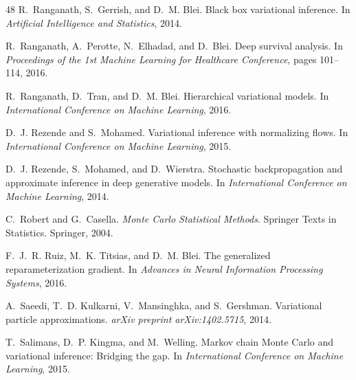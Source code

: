 \begin{thebibliography}{48}
R.~Ranganath, S.~Gerrish, and D.~M. Blei.
\newblock Black box variational inference.
\newblock In \emph{Artificial Intelligence and Statistics}, 2014.

R.~Ranganath, A.~Perotte, N.~Elhadad, and D.~Blei.
\newblock Deep survival analysis.
\newblock In \emph{Proceedings of the 1st Machine Learning for Healthcare
  Conference}, pages 101--114, 2016{}.

R.~Ranganath, D.~Tran, and D.~M. Blei.
\newblock Hierarchical variational models.
\newblock In \emph{International Conference on Machine Learning},
  2016{}.

D.~J. Rezende and S.~Mohamed.
\newblock Variational inference with normalizing flows.
\newblock In \emph{International Conference on Machine Learning}, 2015.

D.~J. Rezende, S.~Mohamed, and D.~Wierstra.
\newblock Stochastic backpropagation and approximate inference in deep
  generative models.
\newblock In \emph{International Conference on Machine Learning}, 2014.

C.~Robert and G.~Casella.
\newblock \emph{Monte Carlo Statistical Methods}.
\newblock Springer Texts in Statistics. Springer, 2004.

F.~J.~R. Ruiz, M.~K. Titsias, and D.~M. Blei.
\newblock The generalized reparameterization gradient.
\newblock In \emph{Advances in Neural Information Processing Systems}, 2016.

A.~Saeedi, T.~D. Kulkarni, V.~Mansinghka, and S.~Gershman.
\newblock Variational particle approximations.
\newblock \emph{arXiv preprint arXiv:1402.5715}, 2014.

T.~Salimans, D.~P. Kingma, and M.~Welling.
\newblock Markov chain {M}onte {C}arlo and variational inference: Bridging the
  gap.
\newblock In \emph{International Conference on Machine Learning}, 2015.


\end{thebibliography}
